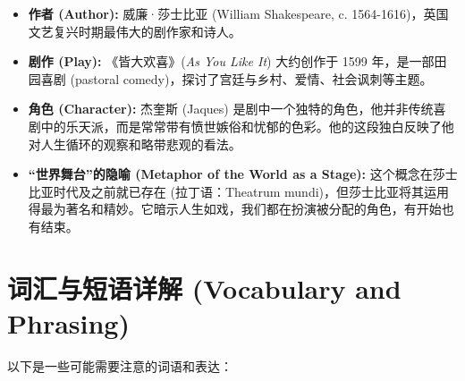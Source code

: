 \documentclass[12pt, a4paper]{article}
\begin{document}
\begin{itemize}
    \item \textbf{作者 (Author):} 威廉·莎士比亚 (William Shakespeare, c. 1564-1616)，英国文艺复兴时期最伟大的剧作家和诗人。
    \item \textbf{剧作 (Play):} 《皆大欢喜》(\textit{As You Like It}) 大约创作于 1599 年，是一部田园喜剧 (pastoral comedy)，探讨了宫廷与乡村、爱情、社会讽刺等主题。
    \item \textbf{角色 (Character):} 杰奎斯 (Jaques) 是剧中一个独特的角色，他并非传统喜剧中的乐天派，而是常常带有愤世嫉俗和忧郁的色彩。他的这段独白反映了他对人生循环的观察和略带悲观的看法。
    \item \textbf{“世界舞台”的隐喻 (Metaphor of the World as a Stage):} 这个概念在莎士比亚时代及之前就已存在 (拉丁语：Theatrum mundi)，但莎士比亚将其运用得最为著名和精妙。它暗示人生如戏，我们都在扮演被分配的角色，有开始也有结束。
\end{itemize}

\section{词汇与短语详解 (Vocabulary and Phrasing)}

以下是一些可能需要注意的词语和表达：
\end{document}
